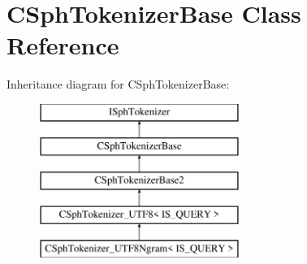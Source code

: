 \hypertarget{classCSphTokenizerBase}{\section{C\-Sph\-Tokenizer\-Base Class Reference}
\label{classCSphTokenizerBase}
}
Inheritance diagram for C\-Sph\-Tokenizer\-Base\-:\begin{figure}[H]
\begin{center}
\leavevmode
\includegraphics[height=5.000000cm]{classCSphTokenizerBase}
\end{center}
\end{figure}
